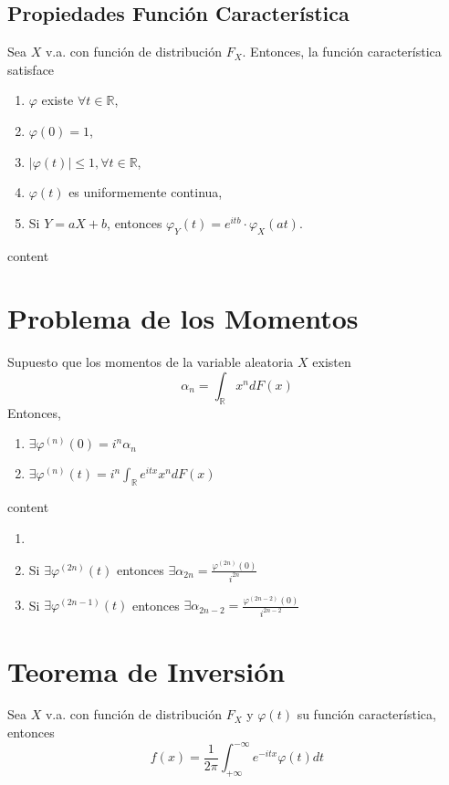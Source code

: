 \subsection{Propiedades Función Característica}

\begin{prop}
  Sea $X$ v.a. con función de distribución $F_{X}$. Entonces, la función característica satisface
  \begin{enumerate}[label=(\roman*)]
    \item $\varphi$ existe $\forall t \in \mathbb{R}$,
    \item $\varphi(0) = 1$,
    \item $| \varphi(t) | \leq 1, \forall t \in \mathbb{R}$,
    \item $\varphi(t)$ es uniformemente continua,
    \item Si $Y = aX + b$, entonces $\varphi_{Y}(t) = e^{itb} \cdot \varphi_{X}(at)$.
  \end{enumerate}
\end{prop}

\begin{dem}
  content
\end{dem}

\section{Problema de los Momentos}

\begin{theo}
  Supuesto que los momentos de la variable aleatoria $X$ existen
  \[ 
    \alpha_{n} = \int_{\mathbb{R}}^{} x^{n} dF(x) 
  \] 
  Entonces,
  \begin{enumerate}[label=(\roman*)]
    \item $\exists \varphi^{(n)}(0) = i^{n} \alpha_{n}$
    \item $\exists \varphi^{(n)}(t) = i^{n} \int_{\mathbb{R}}^{} e^{itx} x^{n} dF(x)$
  \end{enumerate}
\end{theo}

\begin{dem}
  content
\end{dem}

\begin{theo}
  \begin{enumerate}[label=(\roman*)]
    \item []
    \item Si $\exists \varphi^{(2n)}(t)$ entonces $\exists \alpha_{2n} = \frac{\varphi^{(2n)}(0)}{i^{2n}}$
    \item Si $\exists \varphi^{(2n - 1)}(t)$ entonces $\exists \alpha_{2n - 2} = \frac{\varphi^{(2n -2)}(0)}{i^{2n - 2}}$
  \end{enumerate}
\end{theo}

\section{Teorema de Inversión}

\begin{theo}[de Inversión]
  Sea $X$ v.a. con función de distribución $F_{X}$ y $\varphi(t)$ su función característica, entonces
  \[ 
    f(x) = \frac{1}{2 \pi} \int_{+\infty}^{-\infty} e^{-itx} \varphi(t) dt
  \] 
\end{theo}
